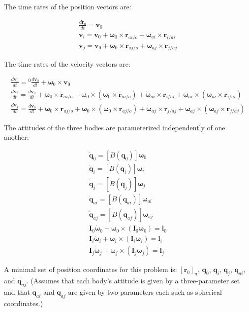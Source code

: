 \documentclass{aiaa-tc}
\newcommand{\br}[2]{[#1]_{#2}} %
\newcommand{\B}[1]{\textbf{#1}} %
\newcommand{\BG}[1]{{\bm #1}}           %
\newcommand{\ddt}[1]{\frac{d#1}{dt}} %
\begin{document}
The time rates of the position vectors are:

\begin{align}
\ddt{\B{r}_0} = \B{v}_0 \\
\B{v}_i = \B{v}_0 + \BG{\omega}_0 \times \B{r}_{ai/o} + \BG{\omega}_{ai} \times \B{r}_{i/ai} \\
\B{v}_j = \B{v}_0 + \BG{\omega}_0 \times \B{r}_{aj/o} + \BG{\omega}_{aj} \times \B{r}_{j/aj}
\end{align}

The time rates of the velocity vectors are:

\begin{align}
\ddt{\B{v}_0} = {}^{0}\ddt{\B{v}_0} + \BG{\omega}_0 \times \B{v}_0\\
\ddt{\B{v}_i} = \ddt{\B{v}_0} + \dot{\BG{\omega}}_0 \times \B{r}_{ai/o} + \BG{\omega}_0 \times (\BG{\omega}_0 \times \B{r}_{ai/o}) + \dot{\BG{\omega}}_{ai} \times \B{r}_{i/ai} + \BG{\omega}_{ai} \times (\BG{\omega}_{ai} \times \B{r}_{i/ai}) \\
\ddt{\B{v}_j} = \ddt{\B{v}_0} + \dot{\BG{\omega}}_0 \times \B{r}_{aj/o} + \BG{\omega}_0 \times (\BG{\omega}_0 \times \B{r}_{aj/o}) + \dot{\BG{\omega}}_{aj} \times \B{r}_{j/aj} + \BG{\omega}_{aj} \times (\BG{\omega}_{aj} \times \B{r}_{j/aj})
\end{align}

The attitudes of the three bodies are parameterized independently of one another:

\begin{align}
\dot{\B{q}}_0 = [B(\B{q}_0)]\BG{\omega}_0\\
\dot{\B{q}}_i = [B(\B{q}_i)]\BG{\omega}_i\\
\dot{\B{q}}_j = [B(\B{q}_j)]\BG{\omega}_j\\
\dot{\B{q}}_{ai} = [B(\B{q}_{ai})]\BG{\omega}_{ai}\\
\dot{\B{q}}_{aj} = [B(\B{q}_{aj})]\BG{\omega}_{aj}\\
\B{I}_0 \dot{\BG{\omega}}_0 + \BG{\omega}_0 \times (\B{I}_0 \BG{\omega}_0) = \B{l}_0 \\
\B{I}_i \dot{\BG{\omega}}_i + \BG{\omega}_i \times (\B{I}_i \BG{\omega}_i) = \B{l}_i \\
\B{I}_j \dot{\BG{\omega}}_j + \BG{\omega}_j \times (\B{I}_j \BG{\omega}_j) = \B{l}_j
\end{align}

A minimal set of position coordinates for this problem is: $\br{\B{r}_0}{n}$, $\B{q}_0$, $\B{q}_i$, $\B{q}_j$, $\B{q}_{ai}$, and $\B{q}_{aj}$. (Assumes that each body's attitude is given by a three-parameter set and that $\B{q}_{ai}$ and $\B{q}_{aj}$ are given by two parameters each such as spherical coordinates.)
\end{document}
